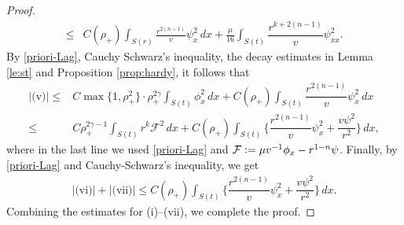 \documentclass[a4paper,12pt,draft]{article}
\theoremstyle{remark}
\def\mF{\mathcal{F}}
\begin{document}
\begin{proof}
\begin{align*}
        \le&  C(\rho_{+}) \int_{S(r)} \frac{r^{2(n-1)}}{v} \psi_x^2 \, dx + \frac{\mu}{16} \int_{S(t)} \!\! \dfrac{r^{k+2(n-1)}}{v} \psi_{xx}^2.
    \end{align*}
    By \eqref{priori-Lag}, Cauchy Schwarz's inequality, the decay estimates in Lemma \ref{le:st} and Proposition \ref{prop:hardy}, it follows that
    \begin{align*}
        |\textrm{(v)}| \le& C  \max\{1,\rho_{+}^2\} \cdot \rho_{+}^{2\gamma} \int_{S(t)} \phi_x^2 \, dx  + C(\rho_{+}) \int_{S(t)}\!\! \dfrac{r^{2(n-1)}}{v} \psi_x^2 \, dx\\
        \le & C \rho_{+}^{2\gamma-1} \int_{S(t)}\!\! r^k \mF^2\, dx + C(\rho_{+}) \int_{S(t)}\!\! \Big\{ \dfrac{r^{2(n-1)}}{v} \psi_x^2 + \dfrac{v\psi^2}{r^2} \Big\} \, dx,
    \end{align*}
    where in the last line we used \eqref{priori-Lag} and $\mF\vcentcolon= \mu v^{-1}\phi_x - r^{1-n}\psi$. Finally, by \eqref{priori-Lag} and Cauchy-Schwarz's inequality, we get
    \begin{align*}
        |\textrm{(vi)}|+|\textrm{(vii)}| \le C(\rho_{+}) \int_{S(t)}\!\! \Big\{ \dfrac{r^{2(n-1)}}{v} \psi_x^2 + \dfrac{v\psi^2}{r^2} \Big\} \, dx.
    \end{align*}
    Combining the estimates for \textrm{(i)}--\textrm{(vii)}, we complete the proof.
\end{proof}
\end{document}
